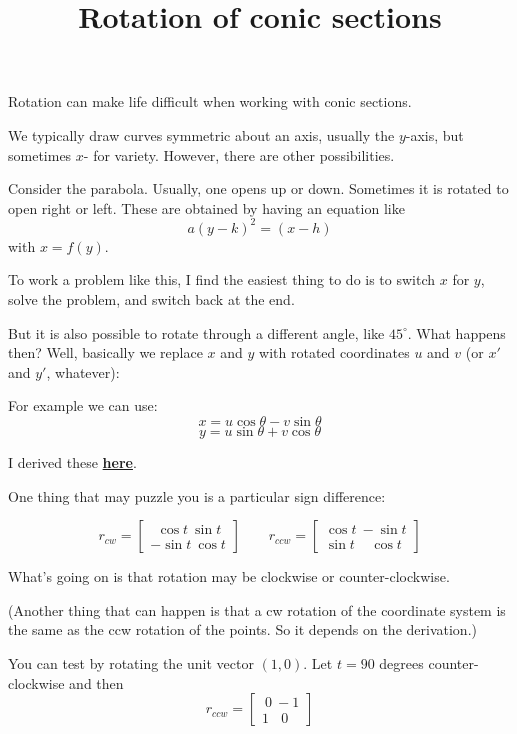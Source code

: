 \documentclass[11pt, oneside]{article}
\title{Rotation of conic sections}
\date{}
\begin{document}
\maketitle
\Large


Rotation can make life difficult when working with conic sections.  

We typically draw curves symmetric about an axis, usually the $y$-axis, but sometimes $x$- for variety.  However, there are other possibilities.

Consider the parabola.  Usually, one opens up or down.  Sometimes it is rotated to open right or left.  These are obtained by having an equation like
\[ a(y-k)^2 = (x-h)  \]
with $x = f(y)$.

To work a problem like this, I find the easiest thing to do is to switch $x$ for $y$, solve the problem, and switch back at the end.

But it is also possible to rotate through a different angle, like $45^\circ$.  What happens then?  Well, basically we replace $x$ and $y$ with rotated coordinates $u$ and $v$ (or $x'$ and $y'$, whatever):

For example we can use:
\[ x = u \cos \theta - v \sin \theta \]
\[ y = u \sin \theta + v \cos \theta \]

I derived these  \hyperref[sec:Geometric_rotation]{\textbf{here}}.

One thing that may puzzle you is a particular sign difference:

\[
r_{cw} =
\begin{bmatrix}
\ \ \cos t \ \sin t \\
-\sin t \ \cos t 
\end{bmatrix}
\ \ \ \ \ \ \ \ \ 
r_{ccw} =
\begin{bmatrix}
\cos t \ - \sin t \\
\sin t\ \ \ \ \ \cos t 
\end{bmatrix}
\]

What's going on is that rotation may be clockwise or counter-clockwise.  

(Another thing that can happen is that a cw rotation of the coordinate system is the same as the ccw rotation of the points.  So it depends on the derivation.)

You can test by rotating the unit vector $(1,0)$.  Let $t = 90$ degrees counter-clockwise and then
\[ r_{ccw} = 
\begin{bmatrix}
\ 0 \ -1 \\
1 \ \ \ \  0 
\end{bmatrix}
\]
\end{document}
